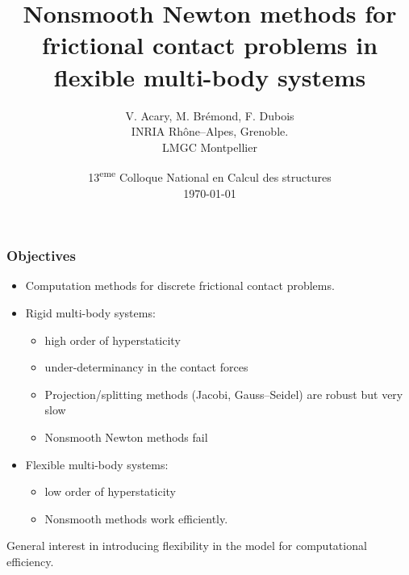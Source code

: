\documentclass[8pt,red]{beamer}
\title{Nonsmooth Newton methods for frictional contact problems in flexible multi-body systems}
\author{V. Acary, M. Br\'emond, F. Dubois \\ INRIA Rh\^one--Alpes, Grenoble. \\ LMGC Montpellier}
\date{13\textsuperscript{eme} Colloque National en Calcul des structures \\ [2mm] \today}
\begin{document}



\begin{frame}
  \frametitle{Objectives}
  \begin{itemize}
  \item Computation methods for discrete frictional contact problems.
  \item Rigid multi-body systems:
    \begin{itemize}
    \item high order of hyperstaticity
    \item under-determinancy in the contact forces
    \item Projection/splitting methods (Jacobi, Gauss--Seidel) are robust but very slow
    \item Nonsmooth Newton methods fail
    \end{itemize}
  \item Flexible multi-body systems:
    \begin{itemize}
    \item low order of hyperstaticity
    \item Nonsmooth methods work efficiently.
    \end{itemize}
  \end{itemize}
  General interest in introducing flexibility in the model for computational efficiency.
\end{frame}



%
\end{document}
